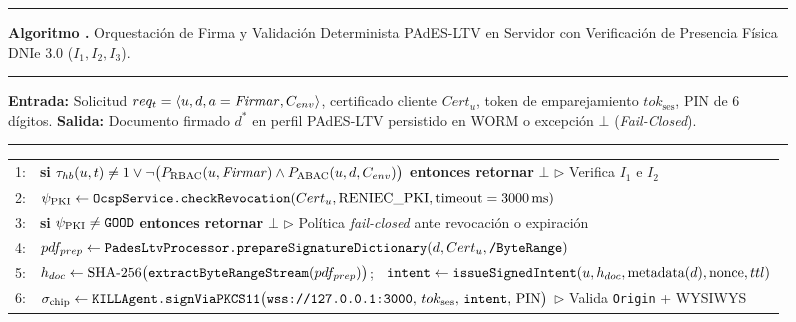 \documentclass[runningheads,twocolumn]{llncs}
\newcounter{algoritmo}
\renewcommand{\thealgoritmo}{\arabic{algoritmo}}
\begin{document}
\begin{figure}[t]
\label{alg:pades_ltv}
\noindent\rule{\textwidth}{1pt}\par\vspace{2pt}
\noindent\textbf{Algoritmo \thealgoritmo.} Orquestación de Firma y Validación Determinista PAdES-LTV en Servidor con Verificación de Presencia Física DNIe 3.0 ($I_1, I_2, I_3$).\par\vspace{2pt}
\noindent\rule{\textwidth}{0.5pt}\par\vspace{2pt}
{\scriptsize
\noindent\textbf{Entrada:} Solicitud $req_t = \langle u, d, a=\text{\textit{Firmar}}, C_{env} \rangle$, certificado cliente $Cert_u$, token de emparejamiento $tok_{\text{ses}}$, PIN de 6 dígitos.\newline
\textbf{Salida:} Documento firmado $d^*$ en perfil PAdES-LTV persistido en WORM o excepción $\bot$ (\textit{Fail-Closed}).\par\vspace{2pt}
\noindent\rule{\textwidth}{0.4pt}
\renewcommand{\arraystretch}{1.08}
\begin{tabularx}{\textwidth}{@{}r>{\raggedright\arraybackslash}X@{}}
1: & \textbf{si} $\tau_{hb}(u,t) \neq 1 \lor \neg\big(P_{\text{RBAC}}(u, \text{\textit{Firmar}}) \wedge P_{\text{ABAC}}(u, d, C_{env})\big)$ \textbf{entonces retornar} $\bot$ \hfill $\triangleright$ Verifica $I_1$ e $I_2$ \\
2: & $\psi_{\text{PKI}} \leftarrow \text{\texttt{OcspService.checkRevocation}}(Cert_u, \text{RENIEC\_PKI}, \text{timeout}=3000\,\text{ms})$ \\
3: & \textbf{si} $\psi_{\text{PKI}} \neq \text{\texttt{GOOD}}$ \textbf{entonces retornar} $\bot$ \hfill $\triangleright$ Política \textit{fail-closed} ante revocación o expiración \\
4: & $pdf_{prep} \leftarrow \text{\texttt{PadesLtvProcessor.prepareSignatureDictionary}}(d, Cert_u, \text{\texttt{/ByteRange}})$ \\
5: & $h_{doc} \leftarrow \text{SHA-256}\big(\text{\texttt{extractByteRangeStream}}(pdf_{prep})\big)$; \, $\text{\texttt{intent}} \leftarrow \text{\texttt{issueSignedIntent}}(u, h_{doc}, \text{metadata}(d), \text{nonce}, ttl)$ \\
6: & $\sigma_{\text{chip}} \leftarrow \text{\texttt{KILLAgent.signViaPKCS11}}\big(\text{\texttt{wss://127.0.0.1:3000}}, \, tok_{\text{ses}}, \, \text{\texttt{intent}}, \, \text{PIN}\big)$ \hfill $\triangleright$ Valida \texttt{Origin} + WYSIWYS \\

\end{tabularx}}
\end{figure}
\end{document}
